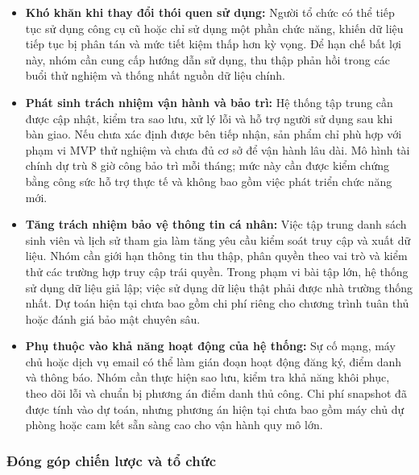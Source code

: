 \begin{itemize}
    \item \textbf{Khó khăn khi thay đổi thói quen sử dụng:} Người tổ chức có thể tiếp tục sử dụng công cụ cũ hoặc chỉ sử dụng một phần chức năng, khiến dữ liệu tiếp tục bị phân tán và mức tiết kiệm thấp hơn kỳ vọng. Để hạn chế bất lợi này, nhóm cần cung cấp hướng dẫn sử dụng, thu thập phản hồi trong các buổi thử nghiệm và thống nhất nguồn dữ liệu chính.

    \item \textbf{Phát sinh trách nhiệm vận hành và bảo trì:} Hệ thống tập trung cần được cập nhật, kiểm tra sao lưu, xử lý lỗi và hỗ trợ người sử dụng sau khi bàn giao. Nếu chưa xác định được bên tiếp nhận, sản phẩm chỉ phù hợp với phạm vi MVP thử nghiệm và chưa đủ cơ sở để vận hành lâu dài. Mô hình tài chính dự trù 8 giờ công bảo trì mỗi tháng; mức này cần được kiểm chứng bằng công sức hỗ trợ thực tế và không bao gồm việc phát triển chức năng mới.

    \item \textbf{Tăng trách nhiệm bảo vệ thông tin cá nhân:} Việc tập trung danh sách sinh viên và lịch sử tham gia làm tăng yêu cầu kiểm soát truy cập và xuất dữ liệu. Nhóm cần giới hạn thông tin thu thập, phân quyền theo vai trò và kiểm thử các trường hợp truy cập trái quyền. Trong phạm vi bài tập lớn, hệ thống sử dụng dữ liệu giả lập; việc sử dụng dữ liệu thật phải được nhà trường thống nhất. Dự toán hiện tại chưa bao gồm chi phí riêng cho chương trình tuân thủ hoặc đánh giá bảo mật chuyên sâu.

    \item \textbf{Phụ thuộc vào khả năng hoạt động của hệ thống:} Sự cố mạng, máy chủ hoặc dịch vụ email có thể làm gián đoạn hoạt động đăng ký, điểm danh và thông báo. Nhóm cần thực hiện sao lưu, kiểm tra khả năng khôi phục, theo dõi lỗi và chuẩn bị phương án điểm danh thủ công. Chi phí snapshot đã được tính vào dự toán, nhưng phương án hiện tại chưa bao gồm máy chủ dự phòng hoặc cam kết sẵn sàng cao cho vận hành quy mô lớn.
\end{itemize}

\subsubsection{Đóng góp chiến lược và tổ chức}

